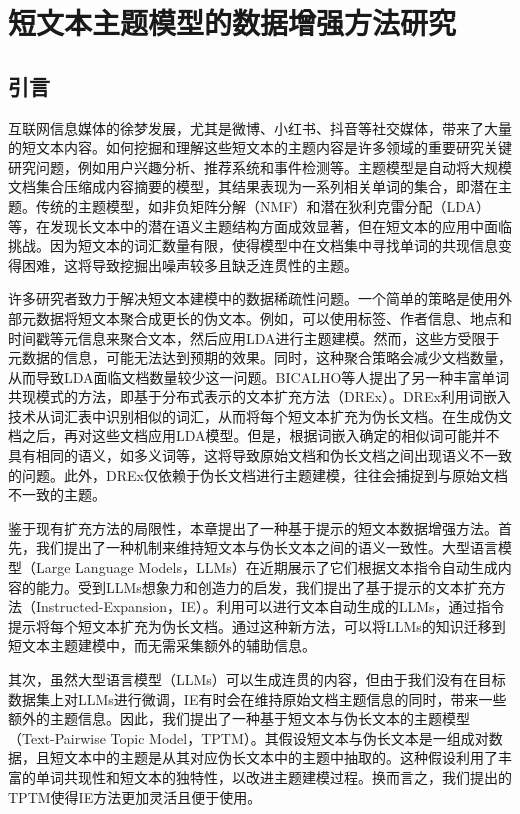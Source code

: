 \chapter{短文本主题模型的数据增强方法研究}\label{chap:Transferring}
\section{引言}
互联网信息媒体的徐梦发展，尤其是微博、小红书、抖音等社交媒体，带来了大量的短文本内容。如何挖掘和理解这些短文本的主题内容是许多领域的重要研究关键研究问题，例如用户兴趣分析、推荐系统和事件检测等\cite{survey_2023}。主题模型是自动将大规模文档集合压缩成内容摘要的模型，其结果表现为一系列相关单词的集合，即潜在主题。传统的主题模型，如非负矩阵分解\cite{NMF}（NMF）和潜在狄利克雷分配\cite{LDA}（LDA）等，在发现长文本中的潜在语义主题结构方面成效显著，但在短文本的应用中面临挑战。因为短文本的词汇数量有限，使得模型中在文档集中寻找单词的共现信息变得困难\cite{survey_2022}，这将导致挖掘出噪声较多且缺乏连贯性的主题。

许多研究者致力于解决短文本建模中的数据稀疏性问题。一个简单的策略是使用外部元数据将短文本聚合成更长的伪文本。例如，可以使用标签、作者信息、地点和时间戳等元信息来聚合文本，然后应用LDA进行主题建模\cite{ExTwitter,PoolTwitter}。然而，这些方受限于元数据的信息，可能无法达到预期的效果。同时，这种聚合策略会减少文档数量，从而导致LDA面临文档数量较少这一问题\cite{few_documents}。BICALHO等人\cite{DREx}提出了另一种丰富单词共现模式的方法，即基于分布式表示的文本扩充方法（DREx）。DREx利用词嵌入技术从词汇表中识别相似的词汇，从而将每个短文本扩充为伪长文档。在生成伪文档之后，再对这些文档应用LDA模型。但是，根据词嵌入确定的相似词可能并不具有相同的语义，如多义词等，这将导致原始文档和伪长文档之间出现语义不一致的问题。此外，DREx仅依赖于伪长文档进行主题建模，往往会捕捉到与原始文档不一致的主题。

鉴于现有扩充方法的局限性，本章提出了一种基于提示的短文本数据增强方法。首先，我们提出了一种机制来维持短文本与伪长文本之间的语义一致性。大型语言模型（Large Language Models，LLMs）在近期展示了它们根据文本指令自动生成内容的能力\cite{glm}。受到LLMs想象力和创造力的启发，我们提出了基于提示的文本扩充方法（Instructed-Expansion，IE）。利用可以进行文本自动生成的LLMs，通过指令提示将每个短文本扩充为伪长文档。通过这种新方法，可以将LLMs的知识迁移到短文本主题建模中，而无需采集额外的辅助信息。

其次，虽然大型语言模型（LLMs）可以生成连贯的内容，但由于我们没有在目标数据集上对LLMs进行微调，IE有时会在维持原始文档主题信息的同时，带来一些额外的主题信息。因此，我们提出了一种基于短文本与伪长文本的主题模型（Text-Pairwise Topic Model，TPTM）。其假设短文本与伪长文本是一组成对数据，且短文本中的主题是从其对应伪长文本中的主题中抽取的。这种假设利用了丰富的单词共现性和短文本的独特性，以改进主题建模过程。换而言之，我们提出的TPTM使得IE方法更加灵活且便于使用。

